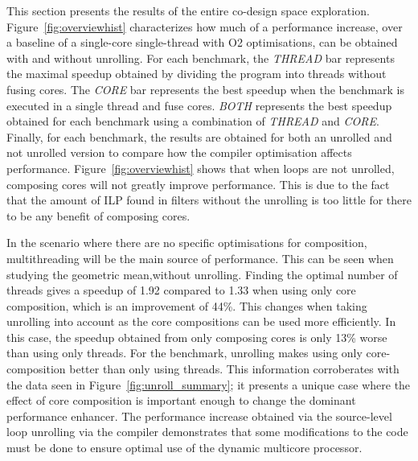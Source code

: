 This section  presents the results of the entire co-design space exploration.
Figure~\ref{fig:overviewhist} characterizes how much of a performance increase, over a baseline of a single-core single-thread with O2 optimisations, can be obtained with and without unrolling.
For each benchmark, the \textit{THREAD} bar represents the maximal speedup obtained by dividing the program into threads without fusing cores.
The \textit{CORE} bar represents the best speedup when the benchmark is executed in a single thread and fuse cores.
\textit{BOTH} represents the best speedup obtained for each benchmark using a combination of \textit{THREAD} and \textit{CORE}.
Finally, for each benchmark, the results are obtained for both an unrolled and not unrolled version to compare how the compiler optimisation affects performance.
Figure~\ref{fig:overviewhist} shows that when loops are not unrolled, composing cores will not greatly improve performance.
This is due to the fact that the amount of ILP found in filters without the unrolling is too little for there to be any benefit of composing cores.

In the scenario where there are no specific optimisations for composition, multithreading will be the main source of performance.
This can be seen when studying the geometric mean,without unrolling.
Finding the optimal number of threads gives a speedup of 1.92 compared to 1.33 when using only core composition, which is an improvement of 44\%.
This changes when taking unrolling into account as the core compositions can be used more efficiently.
In this case, the speedup obtained from only composing cores is only 13\% worse than using only threads.
For the  benchmark, unrolling makes using only core-composition better than only using threads.
This information corroberates with the data seen in Figure~\ref{fig:unroll_summary}; it presents a unique case where the effect of core composition is important enough to change the dominant performance enhancer.
The performance increase obtained via the source-level loop unrolling via the compiler demonstrates that some modifications to the code must be done to ensure optimal use of the dynamic multicore processor.

